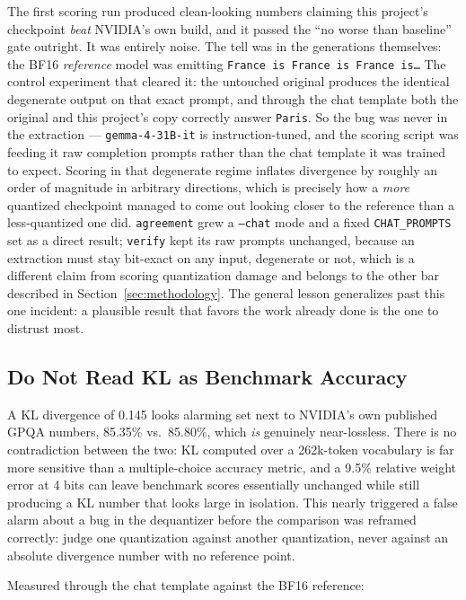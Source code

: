\documentclass[11pt]{article}
\begin{document}
The first scoring run produced clean-looking numbers claiming this project's checkpoint
\emph{beat} NVIDIA's own build, and it passed the ``no worse than baseline'' gate
outright. It was entirely noise. The tell was in the generations themselves: the BF16
\emph{reference} model was emitting \texttt{France is France is France is\ldots} The
control experiment that cleared it: the untouched original produces the identical
degenerate output on that exact prompt, and through the chat template both the original
and this project's copy correctly answer \texttt{Paris}. So the bug was never in the
extraction --- \texttt{gemma-4-31B-it} is instruction-tuned, and the scoring script was
feeding it raw completion prompts rather than the chat template it was trained to expect.
Scoring in that degenerate regime inflates divergence by roughly an order of magnitude
in arbitrary directions, which is precisely how a \emph{more} quantized checkpoint
managed to come out looking closer to the reference than a less-quantized one did.
\texttt{agreement} grew a \texttt{--chat} mode and a fixed \texttt{CHAT\_PROMPTS} set as
a direct result; \texttt{verify} kept its raw prompts unchanged, because an extraction
must stay bit-exact on any input, degenerate or not, which is a different claim from
scoring quantization damage and belongs to the other bar described in
Section~\ref{sec:methodology}. The general lesson generalizes past this one incident: a
plausible result that favors the work already done is the one to distrust most.

\subsection{Do Not Read KL as Benchmark Accuracy}

A KL divergence of 0.145 looks alarming set next to NVIDIA's own published GPQA numbers,
85.35\% vs.\ 85.80\%, which \emph{is} genuinely near-lossless. There is no contradiction
between the two: KL computed over a 262k-token vocabulary is far more sensitive than a
multiple-choice accuracy metric, and a 9.5\% relative weight error at 4 bits can leave
benchmark scores essentially unchanged while still producing a KL number that looks
large in isolation. This nearly triggered a false alarm about a bug in the dequantizer
before the comparison was reframed correctly: judge one quantization against another
quantization, never against an absolute divergence number with no reference point.

Measured through the chat template against the BF16 reference:
\end{document}
